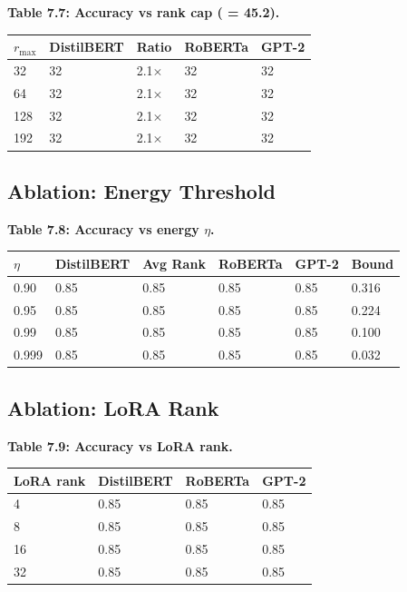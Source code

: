\textbf{Table 7.7: Accuracy vs rank cap (  = 45.2).}

\begin{table}[H]
\centering
\small
\begin{tabular}{lllll}
\toprule
\textbf{$r_\text{max}$} & \textbf{DistilBERT} & \textbf{Ratio} & \textbf{RoBERTa} & \textbf{GPT-2} \\
\midrule
32 & 32 & 2.1$\times$ & 32 & 32 \\
64 & 32 & 2.1$\times$ & 32 & 32 \\
128 & 32 & 2.1$\times$ & 32 & 32 \\
192 & 32 & 2.1$\times$ & 32 & 32 \\
\bottomrule
\end{tabular}
\end{table}

\subsection{Ablation: Energy Threshold}

\textbf{Table 7.8: Accuracy vs energy $\eta$.}

\begin{table}[H]
\centering
\small
\begin{tabular}{llllll}
\toprule
\textbf{$\eta$} & \textbf{DistilBERT} & \textbf{Avg Rank} & \textbf{RoBERTa} & \textbf{GPT-2} & \textbf{Bound} \\
\midrule
0.90 & 0.85 & 0.85 & 0.85 & 0.85 & 0.316 \\
0.95 & 0.85 & 0.85 & 0.85 & 0.85 & 0.224 \\
0.99 & 0.85 & 0.85 & 0.85 & 0.85 & 0.100 \\
0.999 & 0.85 & 0.85 & 0.85 & 0.85 & 0.032 \\
\bottomrule
\end{tabular}
\end{table}

\subsection{Ablation: LoRA Rank}

\textbf{Table 7.9: Accuracy vs LoRA rank.}

\begin{table}[H]
\centering
\small
\begin{tabular}{llll}
\toprule
\textbf{LoRA rank} & \textbf{DistilBERT} & \textbf{RoBERTa} & \textbf{GPT-2} \\
\midrule
4 & 0.85 & 0.85 & 0.85 \\
8 & 0.85 & 0.85 & 0.85 \\
16 & 0.85 & 0.85 & 0.85 \\
32 & 0.85 & 0.85 & 0.85 \\
\bottomrule
\end{tabular}
\end{table}

